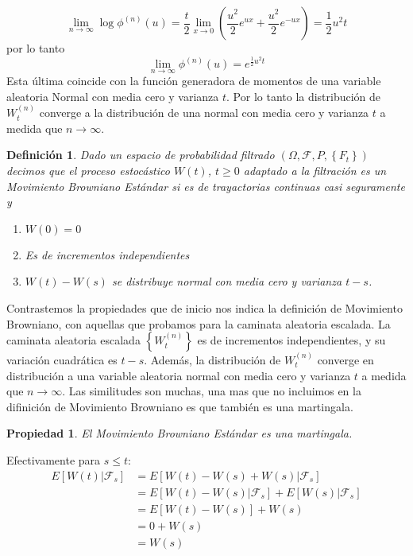 \documentclass{extreport}
\makeatletter
\theoremstyle{definicion}
\newtheorem{definition}{Definición}[chapter]
\theoremstyle{propiedad}
\newtheorem{propiedad}{Propiedad}[chapter]
\theoremstyle{teorema}
\renewenvironment{proof}[1][\proofname]{\par
    \pushQED{\qed}%
    \normalfont \topsep6\p@\@plus6\p@\relax
    \trivlist
    \item\relax
            {\itshape
        #1\@addpunct{.}}\hspace\labelsep\ignorespaces
}{%
    \popQED\endtrivlist\@endpefalse
}
\makeatother
\begin{document}
$$
\lim_{n\rightarrow\infty}\log\phi^{(n)}(u)  = \frac{t}{2}\lim_{x\rightarrow 0}\left(\frac{u^2}{2}e^{ux} + \frac{u^2}{2}e^{-ux}\right) = \frac{1}{2}u^2t
$$
por lo tanto
$$
\lim_{n\rightarrow\infty}\phi^{(n)}(u)  = e^{\frac{1}{2}u^2t}
$$
Esta última coincide con la función generadora de momentos de una variable aleatoria Normal con media cero y varianza $t$. Por lo tanto la distribución de $W_t^{(n)}$ converge a la distribución de una normal con media cero y varianza $t$ a medida que $n\rightarrow\infty$.
\newpage
\begin{definition}
    Dado un espacio de probabilidad filtrado $(\Omega,\mathcal{F}, P, \left\{F_t\right\})$ decimos que el proceso estocástico $W(t)$, $t\geq 0$ adaptado a la filtración es un \emph{Movimiento Browniano Estándar} si es de trayactorias continuas casi seguramente y
    \begin{enumerate}
        \item $W(0) = 0$
        \item Es de incrementos independientes
        \item $W(t)-W(s)$ se distribuye normal con media cero y varianza $t-s$.
    \end{enumerate}
\end{definition}

Contrastemos la propiedades que de inicio nos indica la definición de Movimiento Browniano, con aquellas que probamos para la caminata aleatoria escalada. La caminata aleatoria escalada $\left\{W_t^{(n)}\right\}$ es de incrementos independientes, y su variación cuadrática es $t-s$. Además, la distribución de $W_t^{(n)}$ converge en distribución a una variable aleatoria normal con media cero y varianza $t$ a medida que $n\rightarrow\infty$. Las similitudes son muchas, una mas que no incluimos en la difinición de Movimiento Browniano es que también es una martingala.

\begin{propiedad}
    El Movimiento Browniano Estándar es una martingala.
\end{propiedad}
\begin{proof}
    Efectivamente para $s\leq t$:
    \begin{equation*}
        \begin{split}
            E\left[W(t)\vert \mathcal{F}_s\right] & = E\left[W(t)-W(s) + W(s)\vert \mathcal{F}_s\right]\\
                                                  & = E\left[W(t)-W(s)\vert \mathcal{F}_s\right] + E\left[W(s)\vert \mathcal{F}_s\right]\\
                                                  & = E\left[W(t)-W(s)\right] + W(s)\\
                                                  & = 0 + W(s)\\
                                                  & = W(s)
        \end{split}
        \end{equation*}    
\end{proof}
\end{document}
